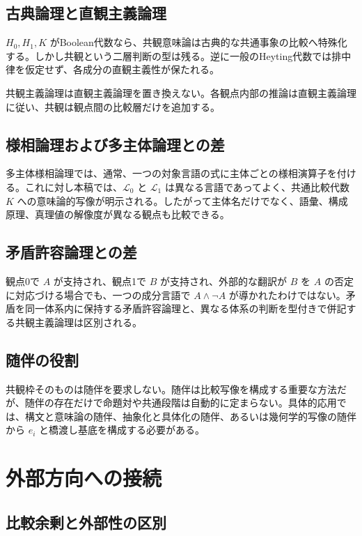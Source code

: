 \documentclass[a4paper,11pt]{ltjsarticle}
\theoremstyle{definition}
\theoremstyle{plain}
\begin{document}
\subsection{古典論理と直観主義論理}

$H_0,H_1,K$ がBoolean代数なら、共観意味論は古典的な共通事象の比較へ特殊化する。しかし共観という二層判断の型は残る。逆に一般のHeyting代数では排中律を仮定せず、各成分の直観主義性が保たれる。

共観主義論理は直観主義論理を置き換えない。各観点内部の推論は直観主義論理に従い、共観は観点間の比較層だけを追加する。

\subsection{様相論理および多主体論理との差}

多主体様相論理では、通常、一つの対象言語の式に主体ごとの様相演算子を付ける。これに対し本稿では、$\mathcal L_0$ と $\mathcal L_1$ は異なる言語であってよく、共通比較代数 $K$ への意味論的写像が明示される。したがって主体名だけでなく、語彙、構成原理、真理値の解像度が異なる観点も比較できる。

\subsection{矛盾許容論理との差}

観点0で $A$ が支持され、観点1で $B$ が支持され、外部的な翻訳が $B$ を $A$ の否定に対応づける場合でも、一つの成分言語で $A\land\neg A$ が導かれたわけではない。矛盾を同一体系内に保持する矛盾許容論理と、異なる体系の判断を型付きで併記する共観主義論理は区別される。

\subsection{随伴の役割}

共観枠そのものは随伴を要求しない。随伴は比較写像を構成する重要な方法だが、随伴の存在だけで命題対や共通段階は自動的に定まらない\cite{Kan1958,MacLane1998,Riehl2016}。具体的応用では、構文と意味論の随伴、抽象化と具体化の随伴、あるいは幾何学的写像の随伴から $e_i$ と橋渡し基底を構成する必要がある。

\section{外部方向への接続}

\subsection{比較余剰と外部性の区別}
\end{document}
